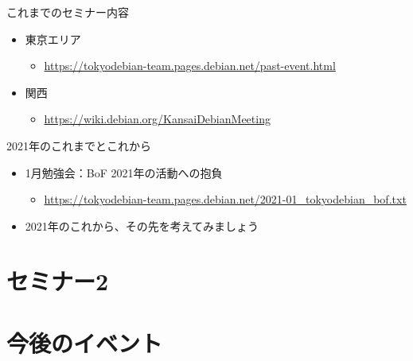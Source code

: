 \begin{frame}{これまでのセミナー内容}
  \begin{itemize}
  \item 東京エリア
    \begin{itemize}
    \item \url{https://tokyodebian-team.pages.debian.net/past-event.html}
    \end{itemize}
  \item 関西
    \begin{itemize}
    \item \url{https://wiki.debian.org/KansaiDebianMeeting}
    \end{itemize}
  \end{itemize}
\end{frame}

\begin{frame}{2021年のこれまでとこれから}
  \begin{itemize}
  \item 1月勉強会：BoF 2021年の活動への抱負
    \begin{itemize}
    \item \url{https://tokyodebian-team.pages.debian.net/2021-01_tokyodebian_bof.txt}
    \end{itemize}
  \item 2021年のこれから、その先を考えてみましょう
  \end{itemize}
\end{frame}


\section{セミナー2}



\section{今後のイベント}

